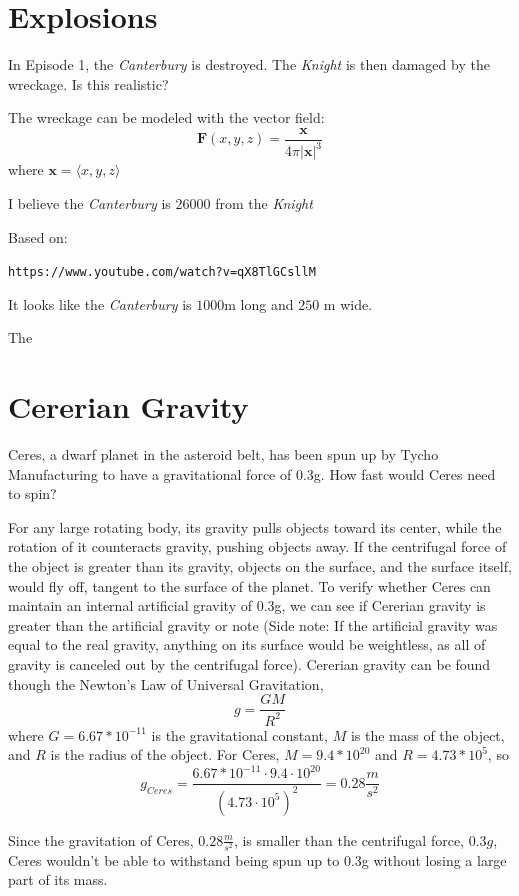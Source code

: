 \documentclass{amsart}
\renewcommand{\vec}{\textbf}
\theoremstyle{definition}
\begin{document}
\section{Explosions}

In Episode 1, the \textit{Canterbury} is destroyed. 
The \textit{Knight} is then damaged by the wreckage. 
Is this realistic?

The wreckage can be modeled with the vector field:
\[
\vec{F}(x,y,z) = \frac{\vec{x}}{4\pi|\vec{x}|^3}
\]
where $\vec{x} = \langle x,y,z\rangle$

I believe the \textit{Canterbury} is $26000$ from the \textit{Knight}

Based on:

\texttt{https://www.youtube.com/watch?v=qX8TlGCsllM}

It looks like the \textit{Canterbury} is $1000$m long and $250$ m wide. 

The


\section{Cererian Gravity}

Ceres, a dwarf planet in the asteroid belt, has been spun up by Tycho Manufacturing to have a gravitational force of $0.3$g. How fast would Ceres need to spin?

For any large rotating body, its gravity pulls objects toward its center, while the rotation of it counteracts gravity, pushing objects away. If the centrifugal force of the object is greater than its gravity, objects on the surface, and the surface itself, would fly off, tangent to the surface of the planet. To verify whether Ceres can maintain an internal artificial gravity of 0.3g, we can see if Cererian gravity is greater than the artificial gravity or note (Side note: If the artificial gravity was equal to the real gravity, anything on its surface would be weightless, as all of gravity is canceled out by the centrifugal force). Cererian gravity can be found though the Newton's Law of Universal Gravitation,
\[
g=\frac{GM}{R^2}
\]
where \(G=6.67*10^{-11}\) is the gravitational constant, \(M\) is the mass of the object, and \(R\) is the radius of the object. For Ceres, \(M=9.4*10^{20}\) and \(R=4.73*10^5\), so
\[
g_{Ceres}=\frac{6.67*10^{-11}\cdot 9.4\cdot 10^{20}}{(4.73\cdot10^5)^2}=0.28\frac{m}{s^2}
\]

Since the gravitation of Ceres, $0.28 \frac{m}{s^2}$, is smaller than the centrifugal force, $0.3g$, Ceres wouldn't be able to withstand being spun up to 0.3g without losing a large part of its mass.
\end{document}

